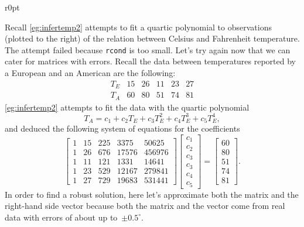 \begin{wrapfigure}r{0pt}
\end{wrapfigure}
\begin{example} 
Recall \cref{eg:infertemp2} attempts to fit a quartic polynomial to observations (plotted to the right) of the relation between Celsius and Fahrenheit temperature. 
The attempt failed because \verb|rcond| is too small.
Let's try again now that we can cater for matrices with errors.
Recall the data between temperatures reported by a European and an American are the following:
\begin{equation*}
\begin{array}{l|rrrrr}
T_E&15&26&11&23&27\\
T_A&60&80&51&74&81
\end{array}
\end{equation*}
\cref{eg:infertemp2} attempts to fit the data with the quartic polynomial
\begin{equation*}
T_A=c_1+c_2T_E+c_3T_E^2+c_4T_E^3+c_5T_E^4,
\end{equation*}
and deduced the following system of equations for the coefficients
\begin{equation*}
\begin{bmatrix} 1&15&225&3375&50625
\\1&26&676&17576&456976
\\1&11&121&1331&14641
\\1&23&529&12167&279841
\\1&27&729&19683&531441 \end{bmatrix}
\begin{bmatrix} c_1\\c_2\\c_3\\c_3\\c_4\\c_5 \end{bmatrix}
=\begin{bmatrix} 60\\80\\51\\74\\81 \end{bmatrix}.
\end{equation*}
In order to find a robust solution, here let's approximate both the matrix and the right-hand side vector because both the matrix and the vector come from real data with errors of about up to~\(\pm0.5^\circ\).


\end{example}
